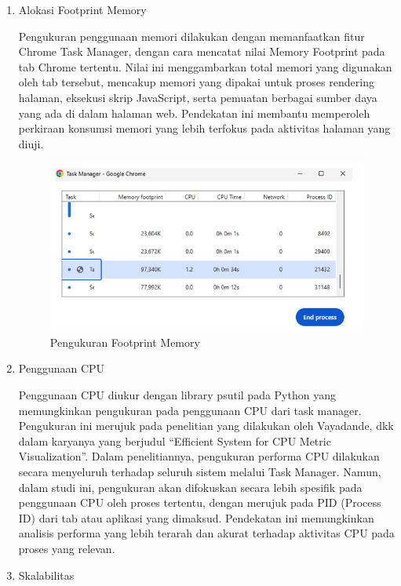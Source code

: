 \begin{enumerate}
	\item Alokasi Footprint Memory 
	
	Pengukuran penggunaan memori dilakukan dengan memanfaatkan fitur Chrome Task Manager, dengan cara mencatat nilai Memory Footprint pada tab Chrome tertentu. Nilai ini menggambarkan total memori yang digunakan oleh tab tersebut, mencakup memori yang dipakai untuk proses rendering halaman, eksekusi skrip JavaScript, serta pemuatan berbagai sumber daya yang ada di dalam halaman web. Pendekatan ini membantu memperoleh perkiraan konsumsi memori yang lebih terfokus pada aktivitas halaman yang diuji.
		\begin{figure}[H]
		\centering
		\includegraphics[width=0.8\linewidth]{gambar/Metodologi/Task Manager.png}
		\caption{Pengukuran Footprint Memory}
		\label{Pengukuran Footprint Memory}
	\end{figure}
	
	\item Penggunaan CPU
	 
	Penggunaan CPU diukur dengan library psutil pada Python yang memungkinkan pengukuran pada penggunaan CPU dari task manager. Pengukuran ini merujuk pada penelitian yang dilakukan oleh Vayadande, dkk dalam karyanya yang berjudul “Efficient System for CPU Metric Visualization”\cite{Vayadande2022}. Dalam penelitiannya, pengukuran performa CPU dilakukan secara menyeluruh terhadap seluruh sistem melalui Task Manager. Namun, dalam studi ini, pengukuran akan difokuskan secara lebih spesifik pada penggunaan CPU oleh proses tertentu, dengan merujuk pada PID (Process ID) dari tab atau aplikasi yang dimaksud. Pendekatan ini memungkinkan analisis performa yang lebih terarah dan akurat terhadap aktivitas CPU pada proses yang relevan.
	
	\item Skalabilitas
	

\end{enumerate}

